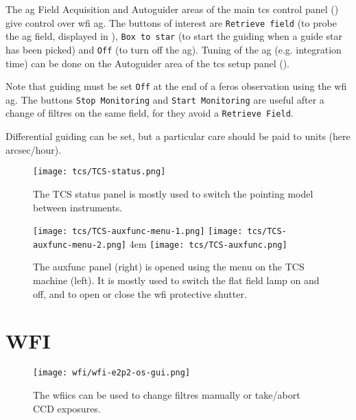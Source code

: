 \documentclass[11pt,fleqn,a4paper]{book}
\begin{document}
The \gls{ag} Field Acquisition and Autoguider areas of the main \gls{tcs}
control panel () give control over \gls{wfi} \gls{ag}.  The buttons
of interest are \texttt{Retrieve field} (to probe the \gls{ag} field, displayed
in ), \texttt{Box to star} (to start the guiding when a guide
star has been picked) and \texttt{Off} (to turn off the \gls{ag}).  Tuning of
the \gls{ag} (e.g. integration time) can be done on  the Autoguider area of the
\gls{tcs} setup panel ().

Note that guiding must be set \texttt{Off} at the end of a \gls{feros}
observation using the \gls{wfi} \gls{ag}. The buttons \texttt{Stop Monitoring}
and \texttt{Start Monitoring} are useful after a change of filtres on the same
field, for they avoid a \texttt{Retrieve Field}.

Differential guiding can be set, but a particular care should be paid
to units (here arcsec/hour).


\begin{figure}[!ht]
\centering
\texttt{[image: tcs/TCS-status.png]}
\caption[Status window of the telescope control software]{The \gls{TCS status panel} is mostly used to switch the \gls{pointing model}
between instruments.}
\label{fig:tcsstatus}
\end{figure}


\begin{figure}[!ht]
\centering
\texttt{[image: tcs/TCS-auxfunc-menu-1.png]}%
\texttt{[image: tcs/TCS-auxfunc-menu-2.png]}
\hglue 4em
\texttt{[image: tcs/TCS-auxfunc.png]}
\caption[Auxiliary functions of the telescope control software]{The \gls{auxfunc} panel (right) is opened using the menu
on the TCS machine (left). It is mostly used to switch the flat field 
lamp on and off, and to open or close the \gls{wfi} \gls{protective shutter}.}
\label{fig:tcsauxfunc}
\end{figure}

\section{WFI}

\begin{figure}[!ht]
\centering
\texttt{[image: wfi/wfi-e2p2-os-gui.png]}
\caption[WFI ICS Control]{The \gls{wfiics} can be used to change filtres manually or
take/abort CCD exposures.}
\label{fig:wfios}
\end{figure}
\end{document}
